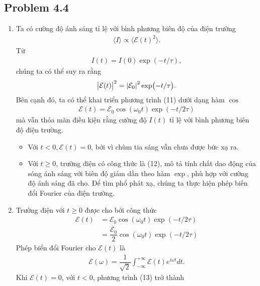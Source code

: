 \documentclass{article}
\newcommand{\f}[2]{\dfrac{#1}{#2}}
\begin{document}
\subsection*{Problem 4.4}
\begin{enumerate}[label=(\alph*)]
	\item Ta có cường độ ánh sáng tỉ lệ với bình phương biên độ của điện trường
	      \begin{align}
		      \langle I \rangle \propto  \langle \mathcal{E}(t)^2 \rangle.
	      \end{align}
	      Từ
	      \begin{align}
		      I(t) = I(0) \exp(-t/\tau),
	      \end{align}
	      chúng ta có thể suy ra rằng
	      \begin{align}
		      \abs{\mathcal{E}(t)}^2 = \abs{\mathcal{E}_0}^2 \exp(-t/\tau).
	      \end{align}
	      Bên cạnh đó, ta có thể khai triển phương trình (11) dưới dạng hàm $\cos$
	      \begin{align}
		      \mathcal{E}(t) = \mathcal{E}_0 \cos(\omega_0 t) \exp(-t/2\tau)
	      \end{align}
	      mà vẫn thỏa mãn điều kiện rằng cường độ $I(t)$ tỉ lệ với bình phương biên độ điện trường.
	      \begin{itemize}
		      \item Với $t<0, \mathcal{E}(t) = 0$, bởi vì chùm tia sáng vẫn chưa được bức xạ ra.
		      \item Với $t \geq 0$, trường điện có công thức là (12), mô tả tính chất dao động của sóng ánh sáng với biên độ giảm dần theo hàm $\exp$, phù hợp với cường độ ánh sáng đã cho. Để tìm phổ phát xạ, chúng ta thực hiện phép biến đổi Fourier của điện trường.
	      \end{itemize}
	\item Trường điện với $t \geq 0$ được cho bởi công thức
	      \begin{align*}
		      \mathcal{E}(t)
		       & = \mathcal{E}_0 \cos(\omega_0 t) \exp(-t/2\tau)        \\
		       & = \f{\mathcal{E}_0}{2} \cos(\omega_0 t) \exp(-t/2\tau)
	      \end{align*}
	      Phép biển đổi Fourier cho $\mathcal{E}(t)$ là
	      \begin{align}
		      \mathcal{E}(\omega) = \f{1}{\sqrt{2}} \int_{-\infty}^{+\infty} \mathcal{E}(t) e^{i\omega t} dt.
	      \end{align}
	      Khi $\mathcal{E}(t) = 0$, với $t < 0$, phương trình (13) trở thành

\end{enumerate}
\end{document}
